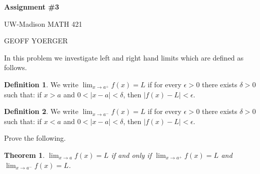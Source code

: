 \documentclass{article} %
\theoremstyle{plain}
\newtheorem*{theorem*}{Theorem}
\theoremstyle{definition}
\newtheorem*{definition*}{Definition}
\newcommand{\abs}[1]{\left\lvert #1 \right\rvert} %
\begin{document}
\begin{center}
    \Large{
        \textbf{Assignment \#3}

        UW-Madison MATH 421
    }
    
    \vspace{5pt}
        
    \normalsize{
        GEOFF YOERGER

        \usdate
    }
    
    \vspace{15pt}
\end{center}
\vspace{15pt}
        
\noindent{} In this problem we investigate left and right hand limits which are defined as follows. 

\begin{definition*} We write $\lim_{x \rightarrow a^+} f(x) = L$ if for every $\epsilon > 0$ there exists $\delta > 0$ such that: if $x >a$ and $0< \abs{x-a} < \delta$, then $\abs{f(x)-L} < \epsilon$. 

\end{definition*}

\begin{definition*} We write $\lim_{x \rightarrow a^-} f(x) = L$ if for every $\epsilon > 0$ there exists $\delta > 0$ such that: if $x <a$ and $0< \abs{x-a} < \delta$, then $\abs{f(x)-L} < \epsilon$. 

\end{definition*}

Prove the following. 

\begin{theorem*} $\lim_{x \rightarrow a} f(x) = L$ if and only if $\lim_{x \rightarrow a^+} f(x) = L$ and $\lim_{x \rightarrow a^-} f(x) = L$.
\end{theorem*}
\end{document}

